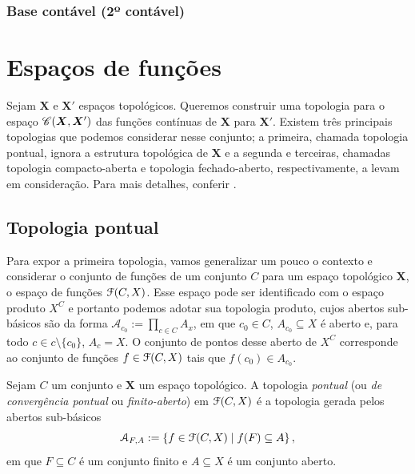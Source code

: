 \subsubsection{Base contável (2º contável)}




\section{Espaços de funções}

Sejam $\bm X$ e $\bm X'$ espaços topológicos. Queremos construir uma topologia para o espaço $\mathscr{C}(\bm X, \bm X')$ das funções contínuas de $\bm X$ para $\bm X'$. Existem três principais topologias que podemos considerar nesse conjunto; a primeira, chamada topologia pontual, ignora a estrutura topológica de $\bm X$ e a segunda e terceiras, chamadas topologia compacto-aberta e topologia fechado-aberto, respectivamente, a levam em consideração. Para mais detalhes, conferir \cite{art:Arens-TopologiesforHomeomorphismGroups}.

\subsection{Topologia pontual}

Para expor a primeira topologia, vamos generalizar um pouco o contexto e considerar o conjunto de funções de um conjunto $C$ para um espaço topológico $\bm X$, o espaço de funções $\mathcal{F}(C,X)$. Esse espaço pode ser identificado com o espaço produto $X^C$ e portanto podemos adotar sua topologia produto, cujos abertos sub-básicos são da forma $\mathcal A_{c_0} := \prod_{c \in C} A_x$, em que $c_0 \in C$, $A_{c_0} \subseteq X$ é aberto e, para todo $c \in c \setminus \{c_0\}$, $A_c = X$. O conjunto de pontos desse aberto de $X^C$ corresponde ao conjunto de funções $f \in \mathcal{F}(C,X)$ tais que $f(c_0) \in A_{c_0}$.

\begin{definition}
Sejam $C$ um conjunto e $\bm X$ um espaço topológico. A topologia \emph{pontual} (ou \emph{de convergência pontual} ou \emph{finito-aberto}) em $\mathcal{F}(C,X)$ é a topologia gerada pelos abertos sub-básicos
	\begin{equation*}
	\mathcal A_{F,A} := \left\{{f \in \mathcal{F}(C,X)}\;\middle\vert\;{f(F) \subseteq A}\right\},
	\end{equation*}
em que $F \subseteq C$ é um conjunto finito e $A \subseteq X$ é um conjunto aberto.
\end{definition}

